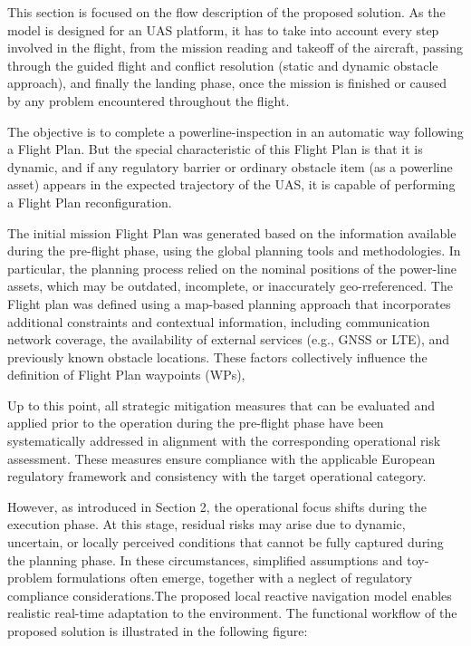 \documentclass[a4paper, 11pt]{article}
\begin{document}
This section is focused on the flow description of the proposed solution. As the model is designed for an UAS platform, it has to take into account every step involved in the flight, from the mission reading and takeoff of the aircraft, passing through the guided flight and conflict resolution (static and dynamic obstacle approach), and finally the landing phase, once the mission is finished or caused by any problem encountered throughout the flight. 

The objective is to complete a powerline-inspection in an automatic way following a Flight Plan. But the special characteristic of this Flight Plan is that it is dynamic, and if any regulatory barrier or ordinary obstacle item (as a powerline asset) appears in the expected trajectory of the UAS, it is capable of performing a Flight Plan reconfiguration. 

The initial mission Flight Plan was generated based on the information available during the pre-flight phase, using the global planning tools and methodologies. In particular, the planning process relied on the nominal positions of the power-line assets, which may be outdated, incomplete, or inaccurately geo-rreferenced. The Flight plan was defined using a map-based planning approach that incorporates additional constraints and contextual information, including communication network coverage, the availability of external services (e.g., GNSS or LTE), and previously known obstacle locations. These factors collectively influence the definition of Flight Plan waypoints (WPs),

Up to this point, all strategic mitigation measures that can be evaluated and applied prior to the operation during the pre-flight phase have been systematically addressed in alignment with the corresponding operational risk assessment. These measures ensure compliance with the applicable European regulatory framework and consistency with the target operational category. 

However, as introduced in Section 2, the operational focus shifts during the execution phase. At this stage, residual risks may arise due to dynamic, uncertain, or locally perceived conditions that cannot be fully captured during the planning phase. In these circumstances, simplified assumptions and toy-problem formulations often emerge, together with a neglect of regulatory compliance considerations.The proposed local reactive navigation model enables realistic real-time adaptation to the environment. The functional workflow of the proposed solution is illustrated in the following figure: 
\end{document}
